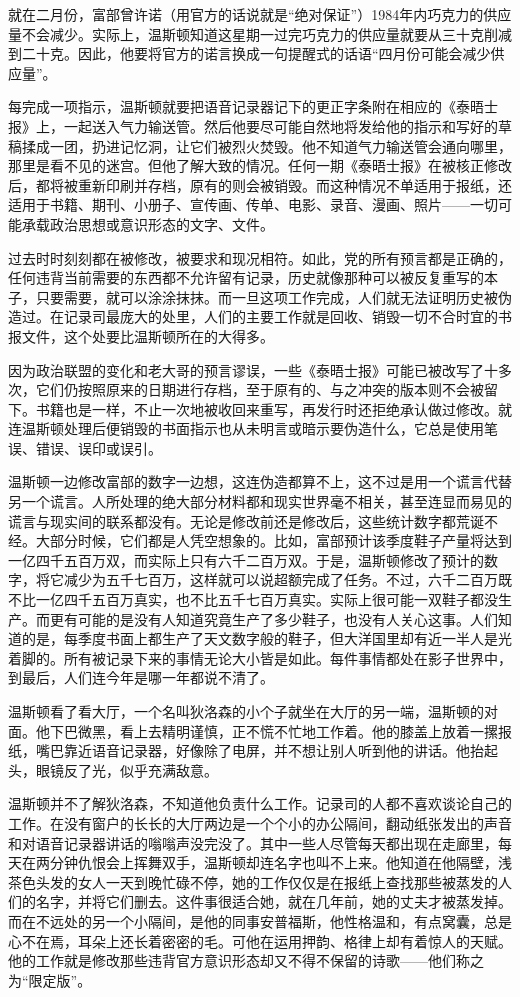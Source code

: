 就在二月份，富部曾许诺（用官方的话说就是``绝对保证''）1984年内巧克力的供应量不会减少。实际上，温斯顿知道这星期一过完巧克力的供应量就要从三十克削减到二十克。因此，他要将官方的诺言换成一句提醒式的话语``四月份可能会减少供应量''。

每完成一项指示，温斯顿就要把语音记录器记下的更正字条附在相应的《泰晤士报》上，一起送入气力输送管。然后他要尽可能自然地将发给他的指示和写好的草稿揉成一团，扔进记忆洞，让它们被烈火焚毁。他不知道气力输送管会通向哪里，那里是看不见的迷宫。但他了解大致的情况。任何一期《泰晤士报》在被核正修改后，都将被重新印刷并存档，原有的则会被销毁。而这种情况不单适用于报纸，还适用于书籍、期刊、小册子、宣传画、传单、电影、录音、漫画、照片------一切可能承载政治思想或意识形态的文字、文件。

过去时时刻刻都在被修改，被要求和现况相符。如此，党的所有预言都是正确的，任何违背当前需要的东西都不允许留有记录，历史就像那种可以被反复重写的本子，只要需要，就可以涂涂抹抹。而一旦这项工作完成，人们就无法证明历史被伪造过。在记录司最庞大的处里，人们的主要工作就是回收、销毁一切不合时宜的书报文件，这个处要比温斯顿所在的大得多。

因为政治联盟的变化和老大哥的预言谬误，一些《泰晤士报》可能已被改写了十多次，它们仍按照原来的日期进行存档，至于原有的、与之冲突的版本则不会被留下。书籍也是一样，不止一次地被收回来重写，再发行时还拒绝承认做过修改。就连温斯顿处理后便销毁的书面指示也从未明言或暗示要伪造什么，它总是使用笔误、错误、误印或误引。

温斯顿一边修改富部的数字一边想，这连伪造都算不上，这不过是用一个谎言代替另一个谎言。人所处理的绝大部分材料都和现实世界毫不相关，甚至连显而易见的谎言与现实间的联系都没有。无论是修改前还是修改后，这些统计数字都荒诞不经。大部分时候，它们都是人凭空想象的。比如，富部预计该季度鞋子产量将达到一亿四千五百万双，而实际上只有六千二百万双。于是，温斯顿修改了预计的数字，将它减少为五千七百万，这样就可以说超额完成了任务。不过，六千二百万既不比一亿四千五百万真实，也不比五千七百万真实。实际上很可能一双鞋子都没生产。而更有可能的是没有人知道究竟生产了多少鞋子，也没有人关心这事。人们知道的是，每季度书面上都生产了天文数字般的鞋子，但大洋国里却有近一半人是光着脚的。所有被记录下来的事情无论大小皆是如此。每件事情都处在影子世界中，到最后，人们连今年是哪一年都说不清了。

温斯顿看了看大厅，一个名叫狄洛森的小个子就坐在大厅的另一端，温斯顿的对面。他下巴微黑，看上去精明谨慎，正不慌不忙地工作着。他的膝盖上放着一摞报纸，嘴巴靠近语音记录器，好像除了电屏，并不想让别人听到他的讲话。他抬起头，眼镜反了光，似乎充满敌意。

温斯顿并不了解狄洛森，不知道他负责什么工作。记录司的人都不喜欢谈论自己的工作。在没有窗户的长长的大厅两边是一个个小的办公隔间，翻动纸张发出的声音和对语音记录器讲话的嗡嗡声没完没了。其中一些人尽管每天都出现在走廊里，每天在两分钟仇恨会上挥舞双手，温斯顿却连名字也叫不上来。他知道在他隔壁，浅茶色头发的女人一天到晚忙碌不停，她的工作仅仅是在报纸上查找那些被蒸发的人们的名字，并将它们删去。这件事很适合她，就在几年前，她的丈夫才被蒸发掉。而在不远处的另一个小隔间，是他的同事安普福斯，他性格温和，有点窝囊，总是心不在焉，耳朵上还长着密密的毛。可他在运用押韵、格律上却有着惊人的天赋。他的工作就是修改那些违背官方意识形态却又不得不保留的诗歌------他们称之为``限定版''。

